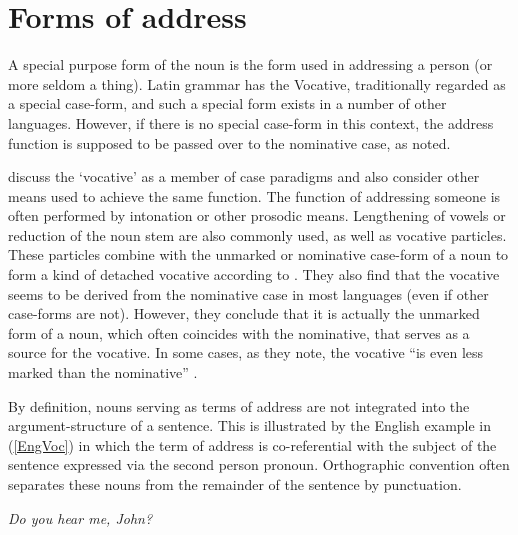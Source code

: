 \section{Forms of address}\label{Address}

A special purpose form of the noun is the form used in addressing a person (or more seldom a thing). 
Latin grammar has the Vocative, traditionally regarded as a special case-form, and such a special form exists in a number of other languages. 
However, if there is no special case-form in this context, the address function is supposed to be passed over to the nominative  case, as \citet[184]{Jespersen:1992} noted. 

\citet{Daniel:2009} discuss the `vocative' as a member of case paradigms and also consider other means used to achieve the same function.
The function of addressing someone is often performed by intonation or other prosodic means. 
Lengthening of vowels or reduction of the noun stem are also commonly used, as well as vocative particles. 
These particles combine with the unmarked or nominative  case-form of a noun to form a kind of detached vocative according to \citet[630]{Daniel:2009}.  
They also find that the vocative seems to be derived from the nominative case in most languages (even if other case-forms are not). 
However, they conclude that it is actually the unmarked form of a noun, which often coincides with the nominative, that serves as a source for the vocative. 
In some cases, as they note, the vocative ``is even less marked than the nominative'' \citep[631]{Daniel:2009}.

By definition, nouns serving as terms of address are not integrated into the argument-structure of a sentence.
This is illustrated by the English example in (\ref{EngVoc}) in which the term of address is co-referential with the subject of the sentence expressed via the second person pronoun.
Orthographic convention often separates these nouns from the remainder of the sentence by punctuation. 

\begin{exe}\ex\label{EngVoc} \textit{Do you hear me, John?}\end{exe}

